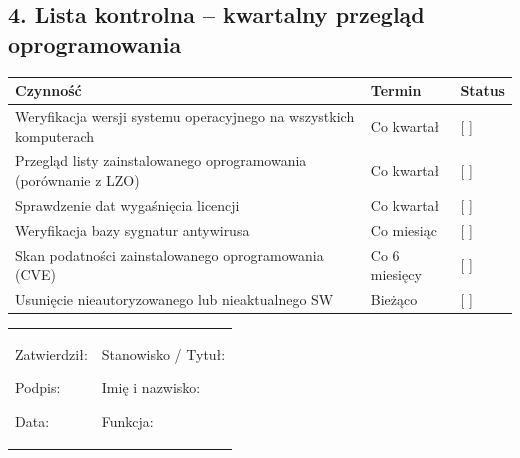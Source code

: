 \documentclass[12pt,a4paper]{article}
\begin{document}
\subsection{4. Lista kontrolna -- kwartalny przegląd
oprogramowania}\label{lista-kontrolna-kwartalny-przeglux105d-oprogramowania}

\begin{longtable}[]{@{}>{\raggedright\arraybackslash}p{}>{\raggedright\arraybackslash}p{}>{\raggedright\arraybackslash}p{}@{}}
\toprule\noalign{}
Czynność & Termin & Status \\
\midrule\noalign{}
\endhead
\bottomrule\noalign{}
\endlastfoot
Weryfikacja wersji systemu operacyjnego na wszystkich komputerach & Co
kwartał & {[} {]} \underline{\hspace{2cm}} \\
Przegląd listy zainstalowanego oprogramowania (porównanie z LZO) & Co
kwartał & {[} {]} \underline{\hspace{2cm}} \\
Sprawdzenie dat wygaśnięcia licencji & Co kwartał & {[} {]}
\underline{\hspace{2cm}} \\
Weryfikacja bazy sygnatur antywirusa & Co miesiąc & {[} {]}
\underline{\hspace{2cm}} \\
Skan podatności zainstalowanego oprogramowania (CVE) & Co 6 miesięcy &
{[} {]} \underline{\hspace{2cm}} \\
Usunięcie nieautoryzowanego lub nieaktualnego SW & Bieżąco & {[} {]}
\underline{\hspace{2cm}} \\
\end{longtable}

\begin{longtable}[]{@{}
  >{\raggedright\arraybackslash}p{}
  >{\raggedright\arraybackslash}p{}@{}}
\toprule\noalign{}
\endhead
\bottomrule\noalign{}
\endlastfoot
\begin{minipage}[t]{\linewidth}\raggedright
Zatwierdził:

Podpis: \underline{\hspace{3cm}}

Data: \underline{\hspace{4cm}}
\end{minipage} & \begin{minipage}[t]{\linewidth}\raggedright
Stanowisko / Tytuł:

Imię i nazwisko: \underline{\hspace{3cm}}

Funkcja: \underline{\hspace{3cm}}
\end{minipage} \\
\end{longtable}
\end{document}
